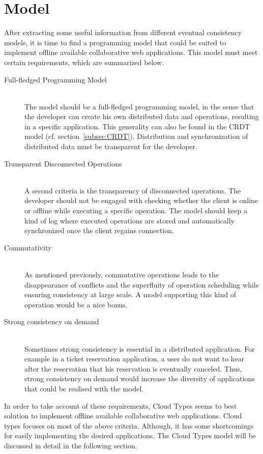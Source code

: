 \documentclass[a4paper,12pt]{report}
\begin{document}
\section{Model}\label{sec:Model}

After extracting some useful information from different eventual consistency models, it is time to find a programming model that could be suited to implement offline available collaborative web applications. This model must meet certain requirements, which are summarized below.

\begin{description}
 \item[Full-fledged Programming Model] \hfill \\The model should be a full-fledged programming model, in the sense that the developer can create his own distributed data and operations, resulting in a specific application. This generality can also be found in the CRDT model (cf. section~\ref{subsec:CRDT}). Distribution and synchronization of distributed data must be transparent for the developer.
 \item[Transparent Disconnected Operations] \hfill \\A second criteria is the transparency of disconnected operations. The developer should not be engaged with checking whether the client is online or offline while executing a specific operation. The model should keep a kind of log where executed operations are stored and automatically synchronized once the client regains connection. 
 \item[Commutativity] \hfill \\As mentioned previously, commutative operations leads to the disappearance of conflicts and the superfluity of operation scheduling while ensuring consistency at large scale. A model supporting this kind of operation would be a nice bonus.  
 \item[Strong consistency on demand] \hfill \\Sometimes strong consistency is essential in a distributed application. For example in a ticket reservation application, a user do not want to hear after the reservation that his reservation is eventually canceled. Thus, strong consistency on demand would increase the diversity of applications that could be realised with the model.
\end{description}

In order to take account of these requirements, Cloud Types seems to best solution to implement offline available collaborative web applications. Cloud types focuses on most of the above criteria. Although, it has some shortcomings for easily implementing the desired applications. The Cloud Types model will be discussed in detail in the following section.
\end{document}
